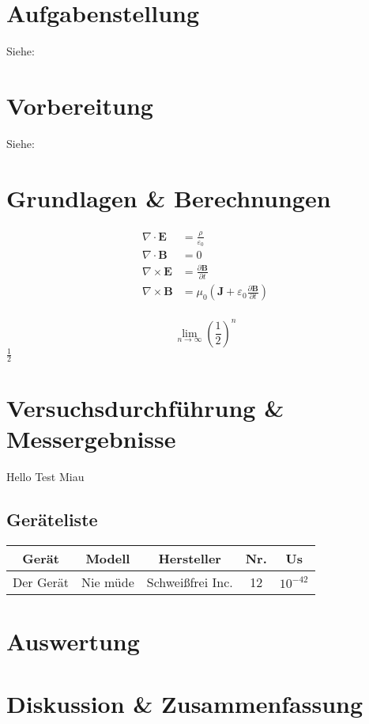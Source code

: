 \documentclass[11pt]{scrartcl}
\begin{document}
\tableofcontents
\newpage

\section{Aufgabenstellung\label{Auf0}}

Siehe:

\section{Vorbereitung}

Siehe: 

\section{Grundlagen \& Berechnungen}
\begin{align}
\nabla \cdot \textbf{E} &= \frac{\rho}{\varepsilon_0} \\
\nabla \cdot \textbf{B} &= 0 \\
\nabla \times \textbf{E} &= \frac{\partial \textbf{B}}{\partial t} \\
\nabla \times \textbf{B} &= \mu_{0}\left(\textbf{J} + \varepsilon_{0} \frac{\partial \textbf{B}}{\partial t}\right)\\
\end{align}

$$\lim_{n\to\infty} (\frac{1}{2})^n$$
$\frac{1}{2}$
\section{Versuchsdurchführung \& Messergebnisse}
Hello Test Miau
\subsection{Geräteliste}
\begin{center}
\begin{tabular}{|c|c|c|c|c|} \hline
\textbf{Gerät} & \textbf{Modell} & \textbf{Hersteller} & \textbf{Nr.} & \textbf{Us}\\ \hline
Der Gerät & Nie müde & Schweißfrei Inc. & 12 & $10^{-42}$ \\ \hline
\end{tabular}
\end{center}

\section{Auswertung}

\section{Diskussion \& Zusammenfassung}

\end{document}
